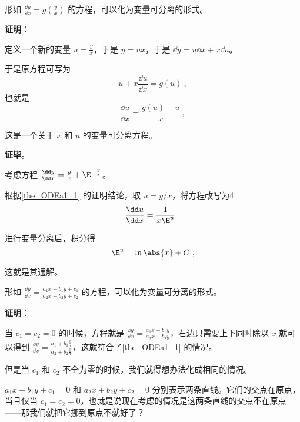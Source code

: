 \begin{theorem}{}\label{the_ODEa1_1}
形如 $\frac{\dd y}{\dd x}=g(\frac{y}{x})$ 的方程，可以化为变量可分离的形式。
\end{theorem}

\textbf{证明}：

定义一个新的变量 $u=\frac{y}{x}$，于是 $y=ux$，于是 $\dd y=u\dd x+x\dd u$。

于是原方程可写为
\begin{equation}
u+x\frac{\dd u}{\dd x}=g(u)~,
\end{equation}
也就是
\begin{equation}
\frac{\dd u}{\dd x}=\frac{g(u)-u}{x}~,
\end{equation}

这是一个关于 $x$ 和 $u$ 的变量可分离方程。

\textbf{证毕}。

\begin{example}{}
考虑方程 $\frac{\dd y}{\dd x}=\frac{y}{x}+\E^{-\frac{y}{x}}$。

根据\autoref{the_ODEa1_1} 的证明结论，取 $u=y/x$，将方程改写为4
\begin{equation}
\frac{\dd u}{\dd x}=\frac{1}{x\E^u}~.
\end{equation}

进行变量分离后，积分得
\begin{equation}
\E^u=\ln\abs{x}+C~,
\end{equation}

这就是其通解。


\end{example}


\begin{corollary}{}\label{cor_ODEa1_1}
形如 $\frac{\dd y}{\dd x}=\frac{a_1x+b_1y+c_1}{a_2x+b_2y+c_2}$ 的方程，可以化为变量可分离的形式。
\end{corollary}

\textbf{证明}：

当 $c_1=c_2=0$ 的时候，方程就是 $\frac{\dd y}{\dd x}=\frac{a_1x+b_1y}{a_2x+b_2y}$，右边只需要上下同时除以 $x$ 就可以得到 $\frac{\dd y}{\dd x}=\frac{a_1+b_1\frac{y}{x}}{a_2+b_2\frac{y}{x}}$，这就符合了\autoref{the_ODEa1_1} 的情况。

但是当 $c_1$ 和 $c_2$ 不全为零的时候，我们就得想办法化成相同的情况。

$a_1x+b_1y+c_1=0$ 和 $a_2x+b_2y+c_2=0$ 分别表示两条直线。它们的交点在原点，当且仅当 $c_1=c_2=0$，也就是说现在考虑的情况是这两条直线的交点不在原点——那我们就把它挪到原点不就好了？

